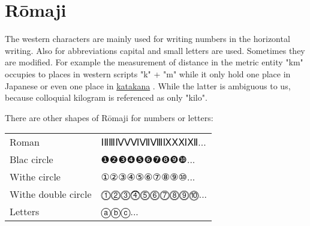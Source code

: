 \section{Rōmaji }
\label{sec:Romaji}



The western characters are mainly used for writing numbers in the horizontal
writing. Also for abbreviations capital and small letters are used. Sometimes
they are modified. For example the measurement of distance in the metric entity
"km" occupies to places in western scripts "k" + "m" while it only hold one
place in Japanese  or even one place in
\hyperref[sec:Katakana]{katakana}  . While the latter is
ambiguous to us, because colloquial kilogram is referenced as only "kilo".


There are other shapes of Rōmaji for numbers or letters:


\begin{center}
\begin{tabular}{ll}
Roman       &ⅠⅡⅢⅣⅤⅥⅦⅧⅨⅩⅪⅫ...\\
Blac circle & ❶❷❸❹❺❻❼❽❾❿...\\
Withe circle &①②③④⑤⑥⑦⑧⑨⑩...\\
Withe double circle & ⓵⓶⓷⓸⓹⓺⓻⓼⓽⓾...\\
Letters             &ⓐⓑⓒ...\\
\end{tabular}
\end{center}

